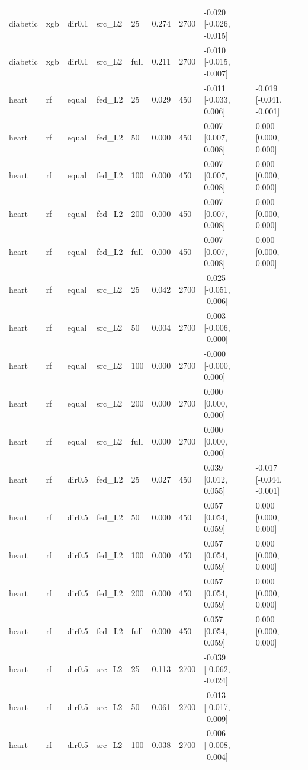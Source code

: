 \begin{tabular}{lllllllll}
diabetic & xgb & dir0.1 & src\_L2 & 25 & 0.274 & 2700 & -0.020 [-0.026, -0.015] &  \\
diabetic & xgb & dir0.1 & src\_L2 & full & 0.211 & 2700 & -0.010 [-0.015, -0.007] &  \\
\addlinespace
heart & rf & equal & fed\_L2 & 25 & 0.029 & 450 & -0.011 [-0.033, 0.006] & -0.019 [-0.041, -0.001] \\
heart & rf & equal & fed\_L2 & 50 & 0.000 & 450 & 0.007 [0.007, 0.008] & 0.000 [0.000, 0.000] \\
heart & rf & equal & fed\_L2 & 100 & 0.000 & 450 & 0.007 [0.007, 0.008] & 0.000 [0.000, 0.000] \\
heart & rf & equal & fed\_L2 & 200 & 0.000 & 450 & 0.007 [0.007, 0.008] & 0.000 [0.000, 0.000] \\
heart & rf & equal & fed\_L2 & full & 0.000 & 450 & 0.007 [0.007, 0.008] & 0.000 [0.000, 0.000] \\
heart & rf & equal & src\_L2 & 25 & 0.042 & 2700 & -0.025 [-0.051, -0.006] &  \\
heart & rf & equal & src\_L2 & 50 & 0.004 & 2700 & -0.003 [-0.006, -0.000] &  \\
heart & rf & equal & src\_L2 & 100 & 0.000 & 2700 & -0.000 [-0.000, 0.000] &  \\
heart & rf & equal & src\_L2 & 200 & 0.000 & 2700 & 0.000 [0.000, 0.000] &  \\
heart & rf & equal & src\_L2 & full & 0.000 & 2700 & 0.000 [0.000, 0.000] &  \\
heart & rf & dir0.5 & fed\_L2 & 25 & 0.027 & 450 & 0.039 [0.012, 0.055] & -0.017 [-0.044, -0.001] \\
heart & rf & dir0.5 & fed\_L2 & 50 & 0.000 & 450 & 0.057 [0.054, 0.059] & 0.000 [0.000, 0.000] \\
heart & rf & dir0.5 & fed\_L2 & 100 & 0.000 & 450 & 0.057 [0.054, 0.059] & 0.000 [0.000, 0.000] \\
heart & rf & dir0.5 & fed\_L2 & 200 & 0.000 & 450 & 0.057 [0.054, 0.059] & 0.000 [0.000, 0.000] \\
heart & rf & dir0.5 & fed\_L2 & full & 0.000 & 450 & 0.057 [0.054, 0.059] & 0.000 [0.000, 0.000] \\
heart & rf & dir0.5 & src\_L2 & 25 & 0.113 & 2700 & -0.039 [-0.062, -0.024] &  \\
heart & rf & dir0.5 & src\_L2 & 50 & 0.061 & 2700 & -0.013 [-0.017, -0.009] &  \\
heart & rf & dir0.5 & src\_L2 & 100 & 0.038 & 2700 & -0.006 [-0.008, -0.004] &  \\

\end{tabular}
